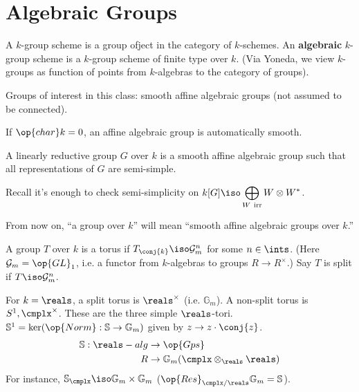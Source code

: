 \section{Algebraic Groups}


\begin{defn}
A $k$-group scheme is a group ofject in the category of $k$-schemes. An
\textbf{algebraic} $k$-group scheme is a $k$-group scheme of finite type over
$k$. (Via Yoneda, we view $k$-groups as function of points from $k$-algebras
to the category of groups).
\end{defn}

Groups of interest in this class: smooth affine algebraic groups (not assumed
to be connected). 

\begin{rmk}
If $\op{char} k = 0$, an affine algebraic group is automatically smooth.
\end{rmk}

\begin{defn}
A linearly reductive group $G$ over $k$ is a smooth affine algebraic group such
that all representations of $G$ are semi-simple.
\end{defn}

\begin{rmk}
Recall it's enough to check semi-simplicity on
$k[G] \iso \displaystyle \bigoplus_{W \ \mathrm{irr}} W \otimes W^*$.
\end{rmk}

From now on, ``a group over $k$'' will mean ``smooth affine algebraic groups
over $k$.''

\begin{defn}
A group $T$ over $k$ is a torus if $T_{\conj{k}} \iso \mathcal{G}_m^n$ for some
$n \in \ints$. (Here $\mathcal{G}_m = \op{GL}_1$, i.e. a functor from
$k$-algebras to groups $R \rightarrow R^\times$.) Say $T$ is split if
$T \iso \mathcal{G}_m^n$.
\end{defn}

\begin{exmpl}
For $k = \reals$, a split torus is $\reals^\times$ (i.e. $\mathbb{G}_m$). A
non-split torus is $S^1, \cmplx^\times$. These are the three simple 
$\reals$-tori. $\mathbb{S}^1
    = \ker(\op{Norm}: \mathbb{S} \rightarrow \mathbb{G}_m)$ given by
    $z \rightarrow z \cdot \conj{z}$.
\begin{align*}
\mathbb{S}: \reals-alg & \rightarrow \op{Gps} \\
R & \rightarrow \mathbb{G}_m(\cmplx \otimes_\reals \reals)
\end{align*}
For instance, $\mathbb{S}_\cmplx \iso \mathbb{G}_m \times \mathbb{G}_m$
($\op{Res}_{\cmplx/\reals} \mathbb{G}_m = \mathbb{S}$).
\end{exmpl}

